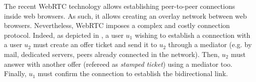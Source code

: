 The recent WebRTC technology allows establishing peer-to-peer connections inside
web browsers. As such, it allows creating an overlay network between web
browsers. Nevertheless, WebRTC imposes a complex and costly connection protocol.
Indeed, as depicted in , a user $u_1$ wishing to establish a
connection with a user $u_2$ must create an offer ticket and send it to $u_2$
through a mediator (e.g. by mail, dedicated servers, peers already connected in
the network). Then, $u_2$ must answer with another offer (refereed as
\emph{stamped ticket}) using a mediator too. Finally, $u_1$ must confirm the
connection to establish the bidirectional link.

